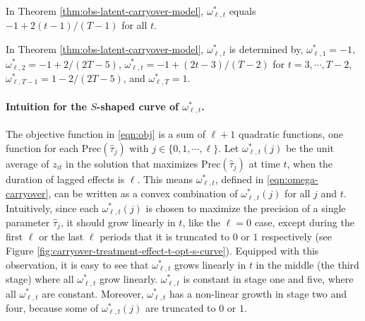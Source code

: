 	
	\begin{example}[$\ell = 1$]\label{example:ell-1}
	In Theorem \ref{thm:obs-latent-carryover-model}, $\omega^\ast_{\ell,t}$ equals
		$-1 + {2(t-1)}/{(T-1)}$ for all $t$.
	\end{example}
%
	\begin{example}[$\ell = 2$]\label{example:ell-2}
	In Theorem \ref{thm:obs-latent-carryover-model}, $\omega^\ast_{\ell,t}$ is determined by, 
$\omega_{\ell,1}^\ast = -1$, $\omega_{\ell,2}^\ast = -1 + {2}/{(2T-5)}$, $\omega_{\ell,t}^\ast = -1 + {(2t-3)}/{(T-2)}$ for $t = 3, \cdots, T-2$, $\omega_{\ell,T-1}^\ast = 1 - {2}/{(2T-5)}$, and $\omega_{{\ell,T}}^\ast = 1$.
	\end{example}
	
    
    {\blue \paragraph{Intuition for the $S$-shaped curve of $\omega_{\ell,t}^\ast$.} The objective function in \eqref{eqn:obj} is a sum of $\ell+1$ quadratic functions, one function for each  $\mathrm{Prec}(\hat{\tau}_j)$ with $j \in \{0,1,\cdots,\ell\}$. Let $\omega_{\ell,t}^\ast(j)$ be the unit average of $z_{it}$ in the solution that maximizes $\mathrm{Prec}(\hat{\tau}_j)$ at time $t$, when the duration of lagged effects is $\ell$. This means $\omega^\ast_{\ell,t}$, defined in \eqref{eqn:omega-carryover}, can be written as a convex combination of $\omega_{\ell,t}^\ast(j)$ for all $j$ and $t$. Intuitively, since each $\omega_{\ell,t}^\ast(j)$ is chosen to maximize the precision of a single parameter $\hat{\tau}_j$, it should grow linearly in $t$, like the $\ell=0$ case, except during the first $\ell$ or the last $\ell$ periods that it is truncated to $0$ or $1$ respectively (see Figure \ref{fig:carryover-treatment-effect-t-opt-s-curve}). 
    Equipped with this observation, it is easy to see that $\omega^\ast_{\ell,t}$ grows linearly in $t$ in the middle (the third stage) where all $\omega^\ast_{\ell,t}$ grow linearly. $\omega^\ast_{\ell,t}$ is constant in stage one and five, where all $\omega^\ast_{\ell,t}$ are constant. Moreover, $\omega^\ast_{\ell,t}$ has a non-linear growth in stage two and four, because some of $\omega_{\ell,t}^\ast(j)$ are truncated to $0$ or $1$. 
    }
    
